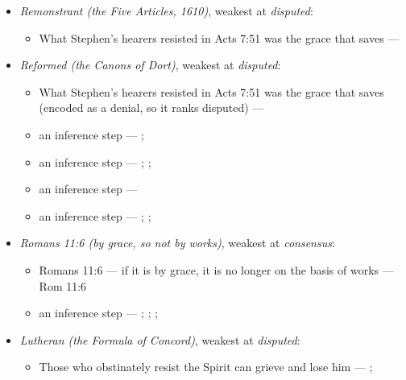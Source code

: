 \documentclass[11pt]{article}
\begin{document}
\begin{itemize}
\item \emph{Remonstrant (the Five Articles, 1610)}, weakest at \emph{disputed}:
\begin{itemize}
\item What Stephen’s hearers resisted in Acts 7:51 was the grace that saves --- \cite[Five Arminian Articles (1610), art. 4]{schaff-creeds-christendom-3-1977}
\end{itemize}
\item \emph{Reformed (the Canons of Dort)}, weakest at \emph{disputed}:
\begin{itemize}
\item What Stephen’s hearers resisted in Acts 7:51 was the grace that saves (encoded as a denial, so it ranks disputed) --- \cite[Canons of Dort, III/IV, art. 9]{schaff-creeds-christendom-3-1977}
\item an inference step --- \cite[ad loc. Eph 2:8]{robertson-word-pictures-4-1931}; \cite[228--229]{calvin-galatians-ephesians-1854}
\item an inference step --- \cite[600]{arminius-works-1-1825}; \cite[681]{arminius-works-1-1825}; \cite[Five Arminian Articles (1610), art. 4]{schaff-creeds-christendom-3-1977}
\item an inference step --- \cite[527--565]{arminius-works-3-1853}
\item an inference step --- \cite[Solid Declaration II.89]{concordia-triglotta-1921}; \cite[Solid Declaration II.60]{concordia-triglotta-1921}; \cite[Solid Declaration XI.41]{concordia-triglotta-1921}
\end{itemize}
\item \emph{Romans 11:6 (by grace, so not by works)}, weakest at \emph{consensus}:
\begin{itemize}
\item Romans 11:6 — if it is by grace, it is no longer on the basis of works --- Rom 11:6
\item an inference step --- \cite[Trent, Session VI (1547), ch. 8]{tanner-decrees-1990}; \cite[36]{waterworth-trent-1848}; \cite[Five Arminian Articles (1610), art. 4]{schaff-creeds-christendom-3-1977}; \cite[Canons of Dort, III/IV, art. 10]{schaff-creeds-christendom-3-1977}
\end{itemize}
\item \emph{Lutheran (the Formula of Concord)}, weakest at \emph{disputed}:
\begin{itemize}
\item Those who obstinately resist the Spirit can grieve and lose him --- \cite[Solid Declaration II.83]{concordia-triglotta-1921}; \cite[Solid Declaration XI.42]{concordia-triglotta-1921}

\end{itemize}
\end{itemize}
\end{document}
